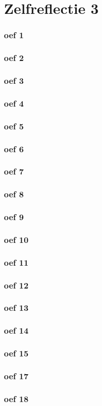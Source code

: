 \documentclass[lineaire_algebra_oplossingen.tex]{subfiles}
\begin{document}
\part{Zelfreflectie 3}
\section{oef 1}
\section{oef 2}
\section{oef 3}
\section{oef 4}
\section{oef 5}
\section{oef 6}
\section{oef 7}
\section{oef 8}
\section{oef 9}
\section{oef 10}
\section{oef 11}
\section{oef 12}
\section{oef 13}
\section{oef 14}
\section{oef 15}
\section{oef 17}
\section{oef 18}
\end{document}
